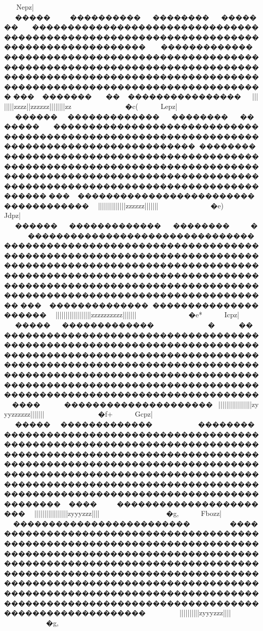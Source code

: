 {{{{{{{{{{{{{{{{{{{{{{{{{{{{{{{{{{{{{{{{{{{{{{{{{{{{{{{{{{{{{{{{{{{{{{{{{{{{{{{{{{{{{{{{{{{{{{{{{{{{{{{{{{{{{{{{{{{{{{{{{{{{{
 Nep{z{|}~~�����~�����������������������������������������������������������������������������������������������������������������~~������������������������������������������������������������������������������������������������������������������������������������������������������������������������������������������~~}}}}||||||||{{{{{{{{{{{{zzzz{{{{||zzzzzz{{{{{{{{{{{{{{{{{|||{{{|||||{{zz~~~~�c(
 Lep{z{|}~~������������������������������������������������������������������������������������������������������������������������������������������������������������������������������������������������������������������������������������������������������������������������������������������������������������������������������������~~}}}}||||||||{{{{{{{{{{{{||||{{{{||zzzzzz{{{{{{{{{{{{{{{{{{{{{{{|||||||}}~~~�e)
 Jdp{z{|}~~������~���������������������~~�������������������������������������������������������������������������������������������������������������������������������������������������������������������������������������������������������������������������������������������������������������������������������������������������~~}}}}||||||||{{{{{{{{{{{{||||||||||zzzzzzz{{{{{{{{{{{{{{{zzz{{{{|||||||}}~~~�e*
Icp{z{|}~~�����~�������������~~~~����������������������������������������������������������������������������������������������������������������������������������������������������������������������������������������������������������������������������������������������������������������������������������������~}}||||||||||||{{{{{{{{{{{{{{{|||||{zyyyzzz{{{{{{{{{{{{{{{zzz{{{{{||||{|||~~~~�f+
Gcp{z{|}~~�������������������������������������������������������������������������������������������������������������������������������������������������������������������������������������������������������������������������������������������������������������������������������������������������������������������������~~}||||||||||||{{{{{{{{{{{{{{{|||||{zyyyzzz{{{{{{{{{{{{{{{{{{{{{{{||||}~~~~~~~}}~~~~�g,
Fbozz|}~~�������������������������������������������������������������������������������������������������������������������������������������������������������������������������������������������������������������������������������������������������������������������������������������������������������������������������������������������������~~~~~~~~~}|||||{{{{{{{{{{{{{{{|||||{zyyyzzz{{{{{{{{{{{{{{{{{{{{{{{||||}}}}}}}}}}~~~~�g,
}}}}}}}}}}}}}}}}}}}}}}}}}}}}}}}}}}}}}}}}}}}}}}}}}}}}}}}}}}}}}}}}}}}}}}}}}}}}}}}}}}}}}}}}}}}}}}}}}}}}}}}}}}}}}}}}}}}}}}}}}}}}}}}}}}}}}}}}}}}}}}}}}}}}}}}}}}}}}}}}}}}}}}}}}}}}}}}}}}}}}}}}}}}}}}}}}}}}}}}}}}}}}}}}}}}}}}}}}}}}}}}}}}}}}}}}}}}}}}}}}}}}}}}}}}}}}}}}}}}}}}}}}}}}}}}}}}}}}}}}}}}}}}}}}}}}}}}}}}}}}}}}}}}}}}}}}}}}}}}
